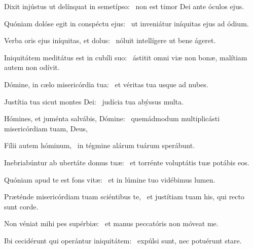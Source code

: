 \item Dixit injústus ut delínquat in semetípso:~\psstar{} non est timor Dei ante óculos ejus.

\item Quóniam dolóse egit in conspéctu ejus:~\psstar{} ut inveniátur iníquitas ejus ad ódium.

\item Verba oris ejus iníquitas, et dolus:~\psstar{} nóluit intellígere ut bene ágeret.

\item Iniquitátem meditátus est in cubíli suo:~\psstar{} ástitit omni viæ non bonæ, malítiam autem non odívit.

\item Dómine, in cælo misericórdia tua:~\psstar{} et véritas tua usque ad nubes.

\item Justítia tua sicut montes Dei:~\psstar{} judícia tua abýssus multa.

\item Hómines, et juménta salvábis, Dómine:~\psstar{} quemádmodum multiplicásti misericórdiam tuam, Deus,

\item Fílii autem hóminum,~\psstar{} in tégmine alárum tuárum sperábunt.

\item Inebriabúntur ab ubertáte domus tuæ:~\psstar{} et torrénte voluptátis tuæ potábis eos.

\item Quóniam apud te est fons vitæ:~\psstar{} et in lúmine tuo vidébimus lumen.

\item Præténde misericórdiam tuam sciéntibus te,~\psstar{} et justítiam tuam his, qui recto sunt corde.

\item Non véniat mihi pes supérbiæ:~\psstar{} et manus peccatóris non móveat me.

\item Ibi cecidérunt qui operántur iniquitátem:~\psstar{} expúlsi sunt, nec potuérunt stare.
